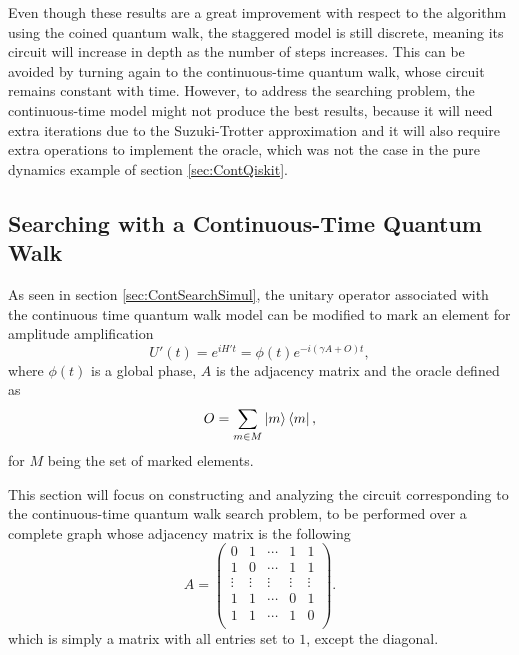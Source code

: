 \documentclass[../../dissertation.tex]{subfiles}
\begin{document}
Even though these results are a great improvement with respect to the algorithm using
the coined quantum walk, the staggered model is still discrete, meaning its
circuit will increase in depth as the number of steps increases. This can be
avoided by turning again to the continuous-time quantum walk, whose circuit
remains constant with time.  However, to address the searching problem, the
continuous-time model might not produce the best results, because it will need extra
iterations due to the Suzuki-Trotter approximation and it will also require
extra operations to implement the oracle, which was not the case in the pure
dynamics example of section \ref{sec:ContQiskit}.

\subsection{Searching with a Continuous-Time Quantum Walk}
As seen in section \ref{sec:ContSearchSimul}, the unitary operator
associated with the continuous time quantum walk model can be modified to
mark an element for amplitude amplification
\begin{equation}
	U'(t) = e^{iH't} = \phi(t)e^{-i(\gamma A+O)t},
	\label{eq:qiskitU'}
\end{equation}
where $\phi(t)$ is a global phase, $A$ is the adjacency matrix and the oracle defined as 
\begin{equation}
	O = \sum_{m \in M} \ket{m}\bra{m},
\end{equation}
for $M$ being the set of marked elements.\par

This section will focus on constructing and analyzing the circuit corresponding to the
continuous-time quantum walk search problem, to be performed over a
complete graph whose adjacency matrix is the following
\begin{equation}
  A = 	\begin{pmatrix}
	  0 & 1 &  \cdots & 1 & 1\\
	  1 & 0 & \cdots & 1 & 1\\
	   \vdots & \vdots  & \vdots & \vdots& \vdots\\
	  1 & 1 & \cdots & 0 & 1\\ 
	  1 & 1 & \cdots & 1 & 0\\ 
	\end{pmatrix}.
\end{equation}
which is simply a matrix with all entries set to $1$, except the diagonal.\par
\end{document}
